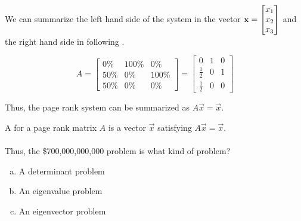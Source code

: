\begin{applicationActivities}{5}{29}
\begin{example}
\begin{multicols}{2}
\begin{center}
  \end{center}

\end{multicols}
  


We can summarize the left hand side of the system in the vector $\mathbf{x}=\begin{bmatrix} x_1 \\ x_2 \\ x_3 \end{bmatrix}$ and the right hand side in following .

\[
  A
    =
  \begin{bmatrix}
    0\% & 100\% & 0\% \\
    50\% & 0\% & 100\% \\
    50\% & 0\% & 0\%
  \end{bmatrix}
    =
  \begin{bmatrix}
    0 & 1 & 0 \\
    \frac{1}{2} & 0 & 1 \\
    \frac{1}{2} & 0 & 0
  \end{bmatrix}
\]

Thus, the page rank system can be summarized as $A\vec{x}=\vec{x}$.  \\

\end{example}

\begin{activity}{5}
A  for a page rank matrix \(A\) is a vector $\vec{x}$
satisfying \(A\vec{x}=\vec{x}\).\\

\ \\
Thus, the \$700,000,000,000 problem is what kind of problem?
\begin{enumerate}[(a)]
\item A determinant problem
\item An eigenvalue problem
\item An eigenvector problem
\end{enumerate}
\end{activity}


\end{applicationActivities}
